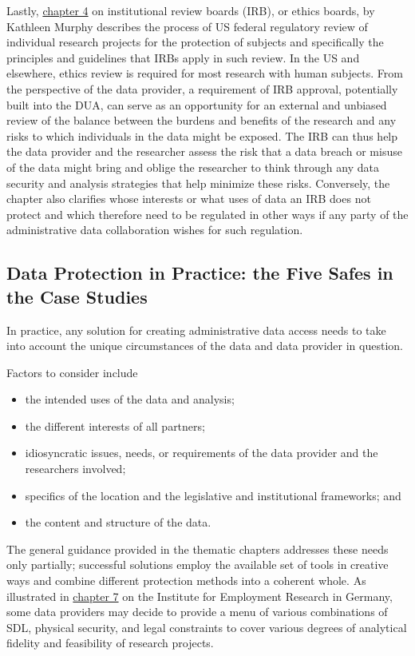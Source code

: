 Lastly, \protect\hyperlink{irb}{chapter 4} on institutional review boards (IRB), or ethics boards, by Kathleen Murphy describes the process of US federal regulatory review of individual research projects for the protection of subjects and specifically the principles and guidelines that IRBs apply in such review. In the US and elsewhere, ethics review is required for most research with human subjects. From the perspective of the data provider, a requirement of IRB approval, potentially built into the DUA, can serve as an opportunity for an external and unbiased review of the balance between the burdens and benefits of the research and any risks to which individuals in the data might be exposed. The IRB can thus help the data provider and the researcher assess the risk that a data breach or misuse of the data might bring and oblige the researcher to think through any data security and analysis strategies that help minimize these risks. Conversely, the chapter also clarifies whose interests or what uses of data an IRB does not protect and which therefore need to be regulated in other ways if any party of the administrative data collaboration wishes for such regulation.

\hypertarget{data-protection-in-practice-the-five-safes-in-the-case-studies}{%
\subsection{Data Protection in Practice: the Five Safes in the Case Studies}\label{data-protection-in-practice-the-five-safes-in-the-case-studies}}

In practice, any solution for creating administrative data access needs to take into account the unique circumstances of the data and data provider in question. 

Factors to consider include
\begin{itemize}
\item
  the intended uses of the data and analysis;
\item
  the different interests of all partners;
\item
  idiosyncratic issues, needs, or requirements of the data provider and the researchers involved;
\item
  specifics of the location and the legislative and institutional frameworks; and
\item
  the content and structure of the data.
\end{itemize}

The general guidance provided in the thematic chapters addresses these needs only partially; successful solutions employ the available set of tools in creative ways and combine different protection methods into a coherent whole. As illustrated in \protect\hyperlink{iab}{chapter 7} on the Institute for Employment Research in Germany, some data providers may decide to provide a menu of various combinations of SDL, physical security, and legal constraints to cover various degrees of analytical fidelity and feasibility of research projects.

